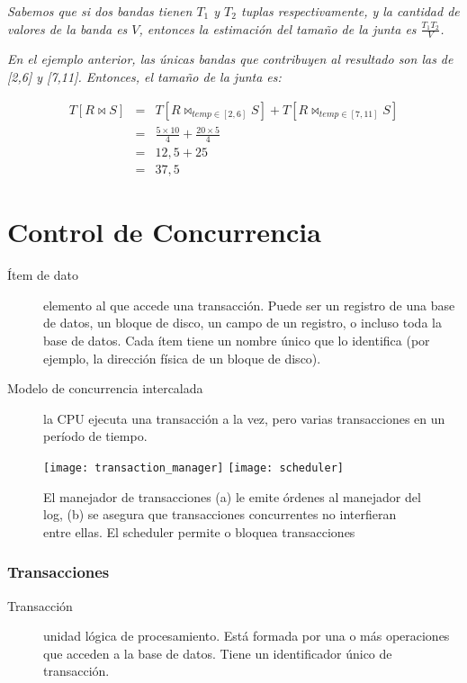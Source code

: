 \documentclass[a4paper, twoside]{article}
\begin{document}
\emph{Sabemos que si dos bandas tienen $T_{1}$ y $T_{2}$ tuplas respectivamente, y la cantidad de valores de la banda es $V$, entonces la estimación del tamaño de la junta es $\frac{T_{1}T_{2}}{V}$.}

\emph{En el ejemplo anterior, las únicas bandas que contribuyen al resultado son las de {[}2,6{]} y {[}7,11{]}. Entonces, el tamaño de la junta es:}

\begin{eqnarray*}
	T \left[ R \bowtie S \right] & = & T \left[ R \bowtie_{temp \in[2,6]} S \right] + T \left[ R \bowtie_{temp \in[7,11]} S \right]\\
	 & = & \frac{5\times10}{4}+\frac{20\times5}{4}\\
	 & = & 12,5+25\\
	 & = & 37,5
\end{eqnarray*}

\newpage
\part{Control de Concurrencia}
\begin{description}
	\item[Ítem de dato] elemento al que accede una transacción. Puede ser un registro de una base de datos, un bloque de disco, un campo de un registro, o incluso toda la base de datos. Cada ítem tiene un nombre único que lo identifica (por ejemplo, la dirección física de un bloque de disco). 
	\item[Modelo de concurrencia intercalada] la CPU ejecuta una transacción a la vez, pero varias transacciones en un período de tiempo.
\end{description}

\begin{figure}[H]
	\centering
	\texttt{[image: transaction\_manager]}
	\texttt{[image: scheduler]}
	\caption{El manejador de transacciones (a) le emite órdenes al manejador del log, (b) se asegura que transacciones concurrentes no interfieran entre ellas. El scheduler permite o bloquea transacciones}
\end{figure}

\section{Transacciones}
\begin{description}
\item [{Transacción}] unidad lógica de procesamiento. Está formada por
una o más operaciones que acceden a la base de datos. Tiene un identificador
único de transacción. 
\end{description}
\end{document}
